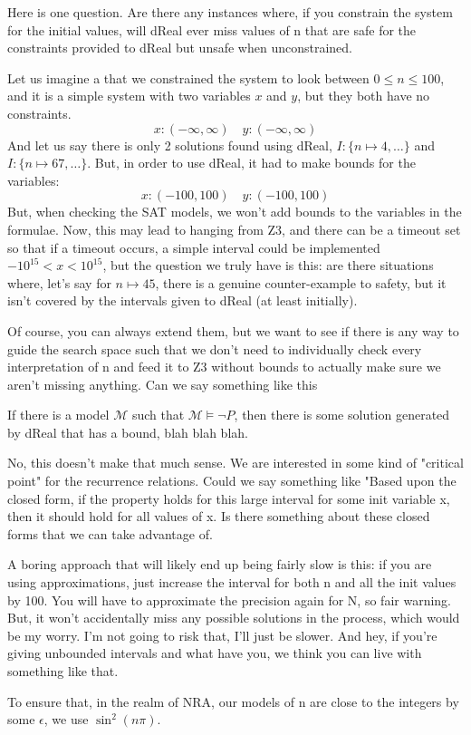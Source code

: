 Here is one question. Are there any instances where, if you constrain the system for the initial values, will dReal ever miss values of n that are safe for the constraints provided to dReal but unsafe when unconstrained.

\begin{example}
    Let us imagine a that we constrained the system to look between $0 \leq n \leq 100$, and it is a simple system with two variables $x$ and $y$, but they both have no constraints.
    \begin{equation*}
        x: (-\infty, \infty)\quad y: (-\infty, \infty)
    \end{equation*}
    And let us say there is only 2 solutions found using dReal, $I: \{n \mapsto 4, \dots\}$ and $I: \{n \mapsto 67, \dots\}$. But, in order to use dReal, it had to make bounds for the variables:
    \begin{equation*}
        x: (-100, 100)\quad y: (-100, 100)
    \end{equation*}
    But, when checking the SAT models, we won't add bounds to the variables in the formulae. Now, this may lead to hanging from Z3, and there can be a timeout set so that if a timeout occurs, a simple interval could be implemented $-10^{15} < x < 10^{15}$, but the question we truly have is this: are there situations where, let's say for $n \mapsto 45$, there is a genuine counter-example to safety, but it isn't covered by the intervals given to dReal (at least initially). 
\end{example}
Of course, you can always extend them, but we want to see if there is any way to guide the search space such that we don't need to individually check every interpretation of n and feed it to Z3 without bounds to actually make sure we aren't missing anything. Can we say something like this
\begin{postulate}
    If there is a model $\mathcal{M}$ such that $\mathcal{M} \models \neg P$, then there is some solution generated by dReal that has a bound, blah blah blah.
\end{postulate}
No, this doesn't make that much sense. We are interested in some kind of "critical point" for the recurrence relations. Could we say something like "Based upon the closed form, if the property holds for this large interval for some init variable x, then it should hold for all values of x. Is there something about these closed forms that we can take advantage of.

A boring approach that will likely end up being fairly slow is this: if you are using approximations, just increase the interval for both n and all the init values by 100. You will have to approximate the precision again for N, so fair warning. But, it won't accidentally miss any possible solutions in the process, which would be my worry. I'm not going to risk that, I'll just be slower. And hey, if you're giving unbounded intervals and what have you, we think you can live with something like that.

\begin{remark}
    To ensure that, in the realm of NRA, our models of n are close to the integers by some $\epsilon$, we use $\sin^2(n\pi)$.
\end{remark}